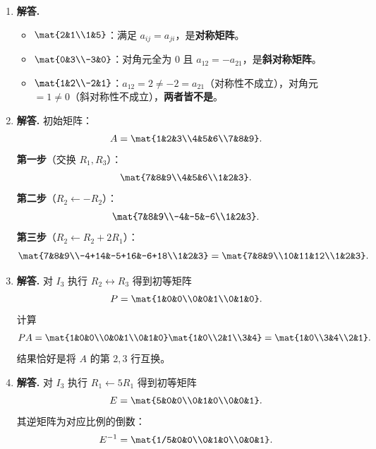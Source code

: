 \begin{enumerate}[label=\textbf{\arabic*.}, leftmargin=*, itemsep=1em]
  \item \textbf{解答.}
  \begin{itemize}
    \item $\mat{2&1\\1&5}$：满足 $a_{ij}=a_{ji}$，是\textbf{对称矩阵}。
    \item $\mat{0&3\\-3&0}$：对角元全为 $0$ 且 $a_{12}=-a_{21}$，是\textbf{斜对称矩阵}。
    \item $\mat{1&2\\-2&1}$：$a_{12}=2\ne -2=a_{21}$（对称性不成立），对角元 $=1\ne0$（斜对称性不成立），\textbf{两者皆不是}。
  \end{itemize}

  \item \textbf{解答.}
  初始矩阵：
  \[
    A = \mat{1&2&3\\4&5&6\\7&8&9}.
  \]
  \textbf{第一步}（交换 $R_1,R_3$）：
  \[
    \mat{7&8&9\\4&5&6\\1&2&3}.
  \]
  \textbf{第二步}（$R_2\leftarrow -R_2$）：
  \[
    \mat{7&8&9\\-4&-5&-6\\1&2&3}.
  \]
  \textbf{第三步}（$R_2\leftarrow R_2+2R_1$）：
  \[
    \mat{7&8&9\\-4+14&-5+16&-6+18\\1&2&3} = \mat{7&8&9\\10&11&12\\1&2&3}.
  \]

  \item \textbf{解答.}
  对 $I_3$ 执行 $R_2\leftrightarrow R_3$ 得到初等矩阵
  \[
    P = \mat{1&0&0\\0&0&1\\0&1&0}.
  \]
  计算
  \[
    PA = \mat{1&0&0\\0&0&1\\0&1&0}\mat{1&0\\2&1\\3&4}
       = \mat{1&0\\3&4\\2&1}.
  \]
  结果恰好是将 $A$ 的第 $2,3$ 行互换。

  \item \textbf{解答.}
  对 $I_3$ 执行 $R_1\leftarrow 5R_1$ 得到初等矩阵
  \[
    E = \mat{5&0&0\\0&1&0\\0&0&1}.
  \]
  其逆矩阵为对应比例的倒数：
  \[
    E^{-1} = \mat{1/5&0&0\\0&1&0\\0&0&1}.
  \]


\end{enumerate}
